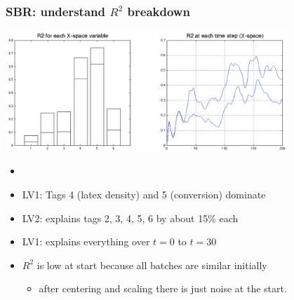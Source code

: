 \begin{frame}\frametitle{SBR: understand \( R^2 \) breakdown}
	
	\begin{center}
		\includegraphics[width=0.8\textwidth]{images/sbr/SBR-R2-over-batch.png}
	\end{center}

	\begin{itemize}
		\item	{}
		
		\item	LV1: Tags 4 (latex density) and 5 (conversion) dominate
		
		\item	LV2: explains tags 2, 3, 4, 5, 6 by about 15\% each
		
		\item	LV1: explains everything over \( t = 0 \)  to \( t = 30 \)
		
		\item	\( R^2 \) is low at start because all batches are similar initially
		
				\begin{itemize}
					\item	after centering and scaling there is just noise at the start.
				\end{itemize}
	\end{itemize}

\end{frame}

